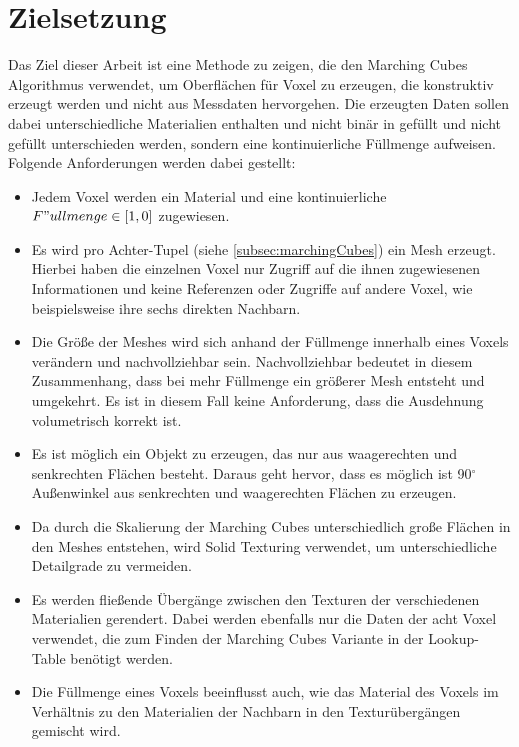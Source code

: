 
\section{Zielsetzung}
\label{sec:zielsetzung}
Das Ziel dieser Arbeit ist eine Methode zu zeigen, die den Marching Cubes Algorithmus verwendet, um Oberflächen für Voxel zu erzeugen, die konstruktiv erzeugt werden und nicht aus Messdaten hervorgehen. Die erzeugten Daten sollen dabei unterschiedliche Materialien enthalten und nicht binär in gefüllt und nicht gefüllt unterschieden werden, sondern eine kontinuierliche Füllmenge aufweisen. Folgende Anforderungen werden dabei gestellt:
\begin{itemize}
\item Jedem Voxel werden ein Material und eine kontinuierliche $F"ullmenge \in [1,0]$ zugewiesen. 
\item Es wird pro Achter-Tupel (siehe \ref{subsec:marchingCubes}) ein Mesh erzeugt. Hierbei haben die einzelnen Voxel nur Zugriff auf die ihnen zugewiesenen Informationen und keine Referenzen oder Zugriffe auf andere Voxel, wie beispielsweise ihre sechs direkten Nachbarn.
\item Die Größe der Meshes wird sich anhand der Füllmenge innerhalb eines Voxels verändern und nachvollziehbar sein. Nachvollziehbar bedeutet in diesem Zusammenhang, dass bei mehr Füllmenge ein größerer Mesh entsteht und umgekehrt. Es ist in diesem Fall keine Anforderung, dass die Ausdehnung volumetrisch korrekt ist.
\item Es ist möglich ein Objekt zu erzeugen, das nur aus waagerechten und senkrechten Flächen besteht. Daraus geht hervor, dass es möglich ist 90$^\circ$ Außenwinkel aus senkrechten und waagerechten Flächen zu erzeugen.
\item Da durch die Skalierung der Marching Cubes unterschiedlich große Flächen in den Meshes entstehen, wird Solid Texturing verwendet, um unterschiedliche Detailgrade zu vermeiden.
\item Es werden fließende Übergänge zwischen den Texturen der verschiedenen Materialien gerendert. Dabei werden ebenfalls nur die Daten der acht Voxel verwendet, die zum Finden der Marching Cubes Variante in der Lookup-Table benötigt werden.
\item Die Füllmenge eines Voxels beeinflusst auch, wie das Material des Voxels im Verhältnis zu den Materialien der Nachbarn in den Texturübergängen gemischt wird.
\end{itemize}